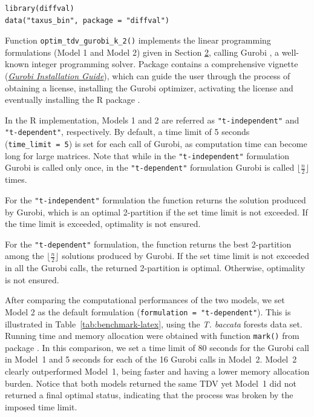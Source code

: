 \begin{verbatim}
library(diffval)
data("taxus_bin", package = "diffval")
\end{verbatim}

Function \texttt{optim\_tdv\_gurobi\_k\_2()} implements the linear programming formulations (Model 1 and Model 2) given in Section \hyperref[casemtwo]{2}, calling Gurobi \citep{gurobi}, a well-known integer programming solver. Package  \citep{HSM2022} contains a comprehensive vignette (\href{https://prioritizr.net/articles/gurobi_installation_guide.html}{\emph{Gurobi Installation Guide}}), which can guide the user through the process of obtaining a license, installing the Gurobi optimizer, activating the license and eventually installing the R package .

In the R implementation, Models 1 and 2 are referred as \texttt{"t-independent"} and \texttt{"t-dependent"}, respectively. By default, a time limit of 5 seconds (\texttt{time\_limit\ =\ 5}) is set for each call of Gurobi, as computation time can become long for large matrices. Note that while in the \texttt{"t-independent"} formulation Gurobi is called only once, in the \texttt{"t-dependent"} formulation Gurobi is called \(\lfloor\frac{n}{2}\rfloor\) times.

For the \texttt{"t-independent"} formulation the function returns the solution produced by Gurobi, which is an optimal 2-partition if the set time limit is not exceeded. If the time limit is exceeded, optimality is not ensured.

For the \texttt{"t-dependent"} formulation, the function returns the best 2-partition among the \(\lfloor\frac{n}{2}\rfloor\) solutions produced by Gurobi. If the set time limit is not exceeded in all the Gurobi calls, the returned 2-partition is optimal. Otherwise, optimality is not ensured.

After comparing the computational performances of the two models, we set Model 2 as the default formulation (\texttt{formulation\ =\ "t-dependent"}). This is illustrated in Table~\ref{tab:benchmark-latex}, using the \emph{T. baccata} forests data set. Running time and memory allocation were obtained with function \texttt{mark()} from package  \citep{HV2021}. In this comparison, we set a time limit of 80 seconds for the Gurobi call in Model~1 and 5 seconds for each of the 16 Gurobi calls in Model~2. Model~2 clearly outperformed Model~1, being faster and having a lower memory allocation burden. Notice that both models returned the same TDV yet Model~1 did not returned a final optimal status, indicating that the process was broken by the imposed time limit.


